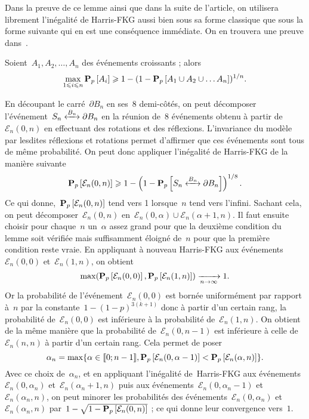 	Dans la preuve de ce lemme ainsi que dans la suite de l'article, on utilisera librement l'inégalité de Harris-FKG aussi bien sous sa forme classique que sous la forme suivante qui en est une conséquence immédiate. On en trouvera une preuve dans~\cite{Grimmett}. 
	\begin{lem}\label{lem:HarrisFKG}
		Soient~$A_1, A_2, \ldots, A_n$ des événements croissants ; alors
		\[
			\max_{1 \leqslant i \leqslant n} \bm{\mathrm{P}}_{p}\left[A_i\right] \geqslant 1 - (1 - \bm{\mathrm{P}}_{p}\left[A_1 \cup A_2 \cup \ldots A_n\right])^{1/n}. 
		\]
	\end{lem}
	
	\begin{dem}
		En découpant le carré~$\partial B_n$ en ses~$8$ demi-côtés, on peut décomposer l'événement~$\relie[B_n]{S_n}{\partial B_n}$ en la réunion de~$8$ événements obtenu à partir de~$\mathcal{E}_n(0, n)$ en effectuant des rotations et des réflexions. L'invariance du modèle par lesdites réflexions et rotations permet d'affirmer que ces événements sont tous de même probabilité. On peut donc appliquer l'inégalité de Harris-FKG de la manière suivante
		\[
			\Pp{\mathcal{E}_n(0,n)} \geq 1 - \left(1 - \Pp{\relie[B_n]{S_n}{\partial B_n}} \right)^{1/8}.
		\]
		Ce qui donne,~$\bm{\mathrm{P}}_{p}\left[\mathcal{E}_n(0, n)\right]$ tend vers 1 lorsque~$n$ tend vers l'infini. Sachant cela, on peut décomposer~$\mathcal{E}_n(0, n)$ en~$\mathcal{E}_n(0, \alpha) \cup \mathcal{E}_n(\alpha + 1, n)$. Il faut ensuite choisir pour chaque~$n$ un~$\alpha$ assez grand pour que la deuxième condition du lemme soit vérifiée mais suffisamment éloigné de~$n$ pour que la première condition reste vraie. En appliquant à nouveau Harris-FKG aux événements~$\mathcal{E}_n(0, 0)$ et~$\mathcal{E}_n(1, n)$, on obtient
		\[
			\max(\bm{\mathrm{P}}_{p}\left[\mathcal{E}_n(0, 0)\right], \bm{\mathrm{P}}_{p}\left[\mathcal{E}_n(1, n)\right]) \xrightarrow[n \to \infty]{} 1.
		\]
		Or la probabilité de l'événement~$\mathcal{E}_n(0,0)$ est bornée uniformément par rapport à~$n$ par la constante~$1 - (1-p)^{3(k+1)}$ donc à partir d'un certain rang, la probabilité de~$\mathcal{E}_n(0,0)$ est inférieure à la probabilité de~$\mathcal{E}_n(1, n)$. On obtient de la même manière que la probabilité de~$\mathcal{E}_n(0, n-1)$ est inférieure à celle de~$\mathcal{E}_n(n, n)$ à partir d'un certain rang. Cela permet de poser
		\[
			\alpha_n = \max \{ \alpha \in \llbracket 0;n-1 \rrbracket, \bm{\mathrm{P}}_{p}\left[\mathcal{E}_n(0, \alpha - 1)\right] < \bm{\mathrm{P}}_{p}\left[\mathcal{E}_n(\alpha, n)\right] \}.
		\]
		Avec ce choix de~$\alpha_n$, et en appliquant l'inégalité de~Harris-FKG aux événements~$\mathcal{E}_n(0, \alpha_n)$ et~$\mathcal{E}_n(\alpha_n + 1, n)$ puis aux événements~$\mathcal{E}_n(0, \alpha_n - 1)$ et~$\mathcal{E}_n(\alpha_n, n)$, on peut minorer les probabilités des événements~$\mathcal{E}_n(0, \alpha_n)$ et~$\mathcal{E}_n(\alpha_n, n)$ par~$1 - \sqrt{1  - \bm{\mathrm{P}}_{p}\left[\mathcal{E}_n(0, n)\right]}$ ; ce qui donne leur convergence vers~$1$. 


\end{dem}
